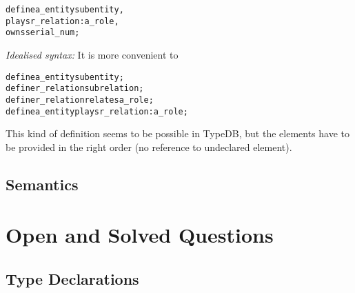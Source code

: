 \documentclass{article}
\begin{document}
\begin{alltt}
define a_entity sub entity,
    plays r_relation:a_role,
    owns serial_num;
\end{alltt}

\emph{Idealised syntax:} It is more convenient to 
\begin{alltt}
  define a_entity sub entity ;
  define r_relation sub relation ;
  define r_relation relates a_role ;
  define a_entity plays r_relation:a_role ;
\end{alltt}
This kind of definition seems to be possible in TypeDB, but the elements have
to be provided in the right order (no reference to undeclared element).


\subsection{Semantics}





\section{Open and Solved Questions}\label{sec:questions}

\subsection{Type Declarations}\label{sec:questions_type_decls}
\end{document}
